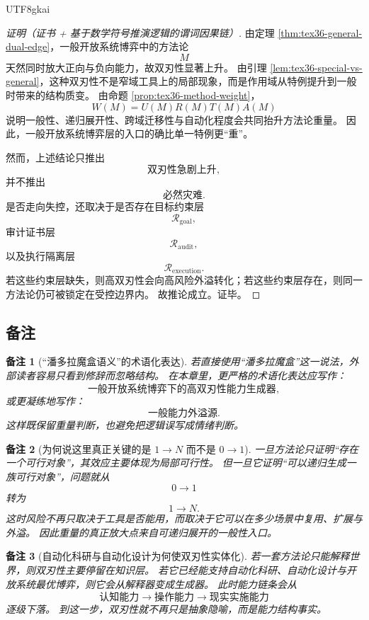 \documentclass[12pt]{article}
\newtheorem{remark}{备注}[section]
\begin{document}
\begin{CJK*}{UTF8}{gkai}
\begin{proof}[证明（证书 + 基于数学符号推演逻辑的谓词因果链）]
由定理 \ref{thm:tex36-general-dual-edge}，一般开放系统博弈中的方法论
\[
  M
\]
天然同时放大正向与负向能力，故双刃性显著上升。
由引理 \ref{lem:tex36-special-vs-general}，这种双刃性不是窄域工具上的局部现象，而是作用域从特例提升到一般时带来的结构质变。
由命题 \ref{prop:tex36-method-weight}，
\[
  W(M)=U(M)R(M)T(M)A(M)
\]
说明一般性、递归展开性、跨域迁移性与自动化程度会共同抬升方法论重量。
因此，一般开放系统博弈层的入口的确比单一特例更“重”。

然而，上述结论只推出
\[
  \text{双刃性急剧上升},
\]
并不推出
\[
  \text{必然灾难}.
\]
是否走向失控，还取决于是否存在目标约束层
\[
  \mathcal R_{\mathrm{goal}},
\]
审计证书层
\[
  \mathcal R_{\mathrm{audit}},
\]
以及执行隔离层
\[
  \mathcal R_{\mathrm{execution}}.
\]
若这些约束层缺失，则高双刃性会向高风险外溢转化；若这些约束层存在，则同一方法论仍可被锁定在受控边界内。
故推论成立。证毕。
\end{proof}

\subsection{备注}
\label{subsec:tex36-ch6-remarks}

\begin{remark}[“潘多拉魔盒语义”的术语化表达]
若直接使用“潘多拉魔盒”这一说法，外部读者容易只看到修辞而忽略结构。
在本章里，更严格的术语化表达应写作：
\[
  \text{一般开放系统博弈下的高双刃性能力生成器},
\]
或更凝练地写作：
\[
  \text{一般能力外溢源}.
\]
这样既保留重量判断，也避免把逻辑误写成情绪判断。
\end{remark}

\begin{remark}[为何说这里真正关键的是 $1\to N$ 而不是 $0\to 1$]
一旦方法论只证明“存在一个可行对象”，其效应主要体现为局部可行性。
但一旦它证明“可以递归生成一族可行对象”，问题就从
\[
  0\to 1
\]
转为
\[
  1\to N.
\]
这时风险不再只取决于工具是否能用，而取决于它可以在多少场景中复用、扩展与外溢。
因此重量的真正放大点来自可递归展开的一般性入口。
\end{remark}

\begin{remark}[自动化科研与自动化设计为何使双刃性实体化]
若一套方法论只能解释世界，则双刃性主要停留在知识层。
若它已经能支持自动化科研、自动化设计与开放系统最优博弈，则它会从解释器变成生成器。
此时能力链条会从
\[
  \text{认知能力}
  \to
  \text{操作能力}
  \to
  \text{现实实施能力}
\]
逐级下落。
到这一步，双刃性就不再只是抽象隐喻，而是能力结构事实。
\end{remark}


\end{CJK*}
\end{document}
